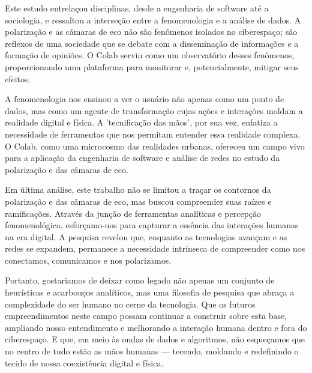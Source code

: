 Este estudo entrelaçou disciplinas, desde a engenharia de software até a sociologia, e ressaltou a interseção entre a fenomenologia e a análise de dados. A polarização e as câmaras de eco não são fenômenos isolados no ciberespaço; são reflexos de uma sociedade que se debate com a disseminação de informações e a formação de opiniões. O Colab serviu como um observatório desses fenômenos, proporcionando uma plataforma para monitorar e, potencialmente, mitigar seus efeitos.

A fenomenologia nos ensinou a ver o usuário não apenas como um ponto de dados, mas como um agente de transformação cujas ações e interações moldam a realidade digital e física. A 'tecnificação das mãos', por sua vez, enfatiza a necessidade de ferramentas que nos permitam entender essa realidade complexa. O Colab, como uma microcosmo das realidades urbanas, ofereceu um campo vivo para a aplicação da engenharia de software e análise de redes no estudo da polarização e das câmaras de eco.

Em última análise, este trabalho não se limitou a traçar os contornos da polarização e das câmaras de eco, mas buscou compreender suas raízes e ramificações. Através da junção de ferramentas analíticas e percepção fenomenológica, esforçamo-nos para capturar a essência das interações humanas na era digital. A pesquisa revelou que, enquanto as tecnologias avançam e as redes se expandem, permanece a necessidade intrínseca de compreender como nos conectamos, comunicamos e nos polarizamos.

Portanto, gostariamos de deixar como legado não apenas um conjunto de heurísticas e acarbouços analíticos, mas uma filosofia de pesquisa que abraça a complexidade do ser humano no cerne da tecnologia. Que os futuros empreendimentos neste campo possam continuar a construir sobre esta base, ampliando nosso entendimento e melhorando a interação humana dentro e fora do ciberespaço. E que, em meio às ondas de dados e algoritmos, não esqueçamos que no centro de tudo estão as mãos humanas — tecendo, moldando e redefinindo o tecido de nossa coexistência digital e física.
